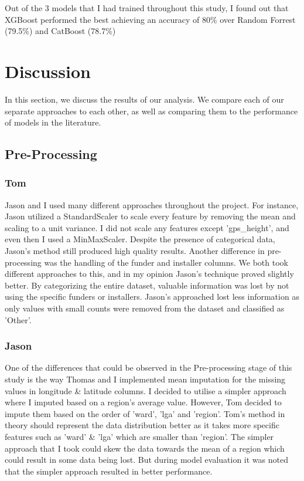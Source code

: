 \documentclass[conference]{IEEEtran}
\begin{document}
Out of the 3 models that I had trained throughout this study, I found out that XGBoost performed the best achieving an accuracy of 80\% over Random Forrest (79.5\%) and CatBoost (78.7\%)

\section{Discussion}

In this section, we discuss the results of our analysis. We compare each of our separate approaches to each other, as well as comparing them to the performance of models in the literature.

\subsection{Pre-Processing}

\subsubsection{Tom}

Jason and I used many different approaches throughout the project. For instance, Jason utilized a StandardScaler to scale every feature by removing the mean and scaling to a unit variance. I did not scale any features except 'gps\_height', and even then I used a MinMaxScaler. Despite the presence of categorical data, Jason's method still produced high quality results. Another difference in pre-processing was the handling of the funder and installer columns. We both took different approaches to this, and in my opinion Jason's technique proved slightly better. By categorizing the entire dataset, valuable information was lost by not using the specific funders or installers. Jason's approached lost less information as only values with small counts were removed from the dataset and classified as 'Other'.

\subsubsection{Jason}

One of the differences that could be observed in the Pre-processing stage of this study is the way Thomas and I implemented mean imputation for the missing values in longitude \& latitude columns. I decided to utilise a simpler approach where I imputed based on a region's average value. However, Tom decided to impute them based on the order of 'ward', 'lga' and 'region'. Tom's method in theory should represent the data distribution better as it takes more specific features such as 'ward' \& 'lga' which are smaller than 'region'. The simpler approach that I took could skew the data towards the mean of a region which could result in some data being lost. But during model evaluation it was noted that the simpler approach resulted in better performance.
\end{document}
